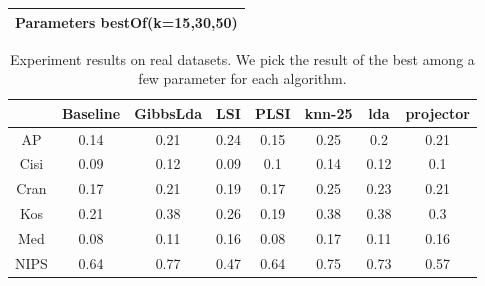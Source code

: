 \documentclass[10pt]{article}
\begin{document}
\begin{tabular}{|c|}
\hline 
Parameters bestOf(k=15,30,50) \\
 \hline 

\end{tabular}


\begin{table}
\begin{tabular}{|c|c|c|c|c|c|c|c|}
\hline 
 &Baseline &GibbsLda &LSI &PLSI &knn-25 &lda &projector \\
 \hline 
AP &0.14 &0.21 &0.24 &0.15 &0.25 &0.2 &0.21 \\
 \hline 
Cisi &0.09 &0.12 &0.09 &0.1 &0.14 &0.12 &0.1 \\
 \hline 
Cran &0.17 &0.21 &0.19 &0.17 &0.25 &0.23 &0.21 \\
 \hline 
Kos &0.21 &0.38 &0.26 &0.19 &0.38 &0.38 &0.3 \\
 \hline 
Med &0.08 &0.11 &0.16 &0.08 &0.17 &0.11 &0.16 \\
 \hline 
NIPS &0.64 &0.77 &0.47 &0.64 &0.75 &0.73 &0.57 \\
 \hline 

\end{tabular}
\caption{Experiment results on real datasets. We pick the result of the best among a few parameter for each algorithm. }
\end{table}
\end{document}
